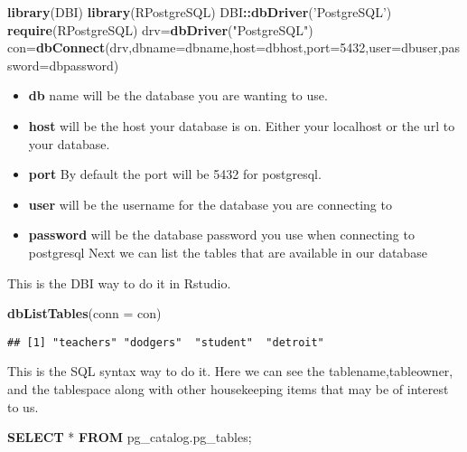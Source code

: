\documentclass[]{book}
\newenvironment{Shaded}{\begin{snugshade}}{\end{snugshade}}
\newcommand{\KeywordTok}[1]{\textcolor[rgb]{0.13,0.29,0.53}{\textbf{#1}}}
\newcommand{\DataTypeTok}[1]{\textcolor[rgb]{0.13,0.29,0.53}{#1}}
\newcommand{\DecValTok}[1]{\textcolor[rgb]{0.00,0.00,0.81}{#1}}
\newcommand{\StringTok}[1]{\textcolor[rgb]{0.31,0.60,0.02}{#1}}
\newcommand{\OperatorTok}[1]{\textcolor[rgb]{0.81,0.36,0.00}{\textbf{#1}}}
\newcommand{\NormalTok}[1]{#1}
\providecommand{\tightlist}{%
  \setlength{\itemsep}{0pt}\setlength{\parskip}{0pt}}
\begin{document}
\begin{Shaded}
\begin{Highlighting}[]
\KeywordTok{library}\NormalTok{(DBI)}
\KeywordTok{library}\NormalTok{(RPostgreSQL)}
\NormalTok{DBI}\OperatorTok{::}\KeywordTok{dbDriver}\NormalTok{(}\StringTok{'PostgreSQL'}\NormalTok{)}
\KeywordTok{require}\NormalTok{(RPostgreSQL)}
\NormalTok{drv=}\KeywordTok{dbDriver}\NormalTok{(}\StringTok{"PostgreSQL"}\NormalTok{)}
\NormalTok{con=}\KeywordTok{dbConnect}\NormalTok{(drv,}\DataTypeTok{dbname=}\NormalTok{dbname,}\DataTypeTok{host=}\NormalTok{dbhost,}\DataTypeTok{port=}\DecValTok{5432}\NormalTok{,}\DataTypeTok{user=}\NormalTok{dbuser,}\DataTypeTok{password=}\NormalTok{dbpassword)}
\end{Highlighting}
\end{Shaded}

\begin{itemize}
\tightlist
\item
  \textbf{db} name will be the database you are wanting to use.
\item
  \textbf{host} will be the host your database is on. Either your
  localhost or the url to your database.
\item
  \textbf{port} By default the port will be 5432 for postgresql.
\item
  \textbf{user} will be the username for the database you are connecting
  to
\item
  \textbf{password} will be the database password you use when
  connecting to postgresql Next we can list the tables that are
  available in our database
\end{itemize}

This is the DBI way to do it in Rstudio.

\begin{Shaded}
\begin{Highlighting}[]
\KeywordTok{dbListTables}\NormalTok{(}\DataTypeTok{conn =}\NormalTok{ con)}
\end{Highlighting}
\end{Shaded}

\begin{verbatim}
## [1] "teachers" "dodgers"  "student"  "detroit"
\end{verbatim}

This is the SQL syntax way to do it. Here we can see the
tablename,tableowner, and the tablespace along with other housekeeping
items that may be of interest to us.

\begin{Shaded}
\begin{Highlighting}[]
\KeywordTok{SELECT}\NormalTok{ * }\KeywordTok{FROM}\NormalTok{ pg_catalog.pg_tables;}
\end{Highlighting}
\end{Shaded}
\end{document}
